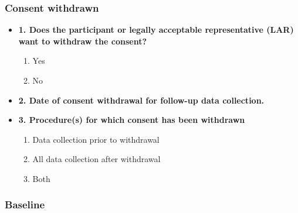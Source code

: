 \documentclass[
]{scrartcl}
\providecommand{\tightlist}{%
  \setlength{\itemsep}{0pt}\setlength{\parskip}{0pt}}\usepackage{longtable,booktabs,array}
\begin{document}
\hypertarget{consent-withdrawn}{%
\subsubsection{Consent withdrawn}\label{consent-withdrawn}}

\begin{itemize}
\item
  \textbf{1. Does the participant or legally acceptable representative
  (LAR) want to withdraw the consent?}

  \begin{enumerate}
  \def\labelenumi{\arabic{enumi}.}
  \tightlist
  \item
    Yes
  \item
    No
  \end{enumerate}
\item
  \textbf{2. Date of consent withdrawal for follow-up data collection.}
\item
  \textbf{3. Procedure(s) for which consent has been withdrawn}

  \begin{enumerate}
  \def\labelenumi{\arabic{enumi}.}
  \tightlist
  \item
    Data collection prior to withdrawal
  \item
    All data collection after withdrawal
  \item
    Both
  \end{enumerate}
\end{itemize}

\hypertarget{baseline}{%
\subsubsection{Baseline}\label{baseline}}
\end{document}
